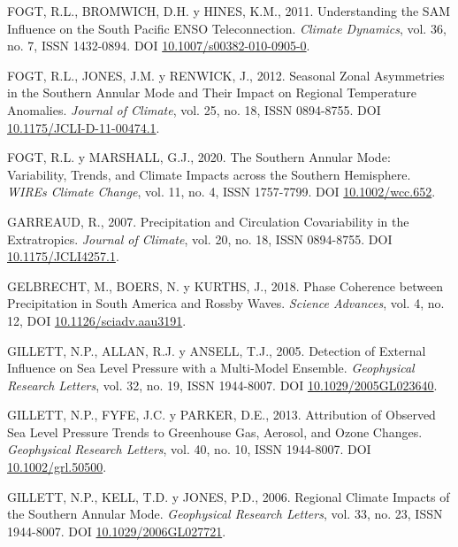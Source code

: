 \documentclass[12pt,oneside,a4paper]{reedthesis}
\newlength{\cslhangindent}
\newenvironment{CSLReferences}[2] %
 {%
  \setlength{\parindent}{0pt}
  \ifodd #1 \everypar{\setlength{\hangindent}{\cslhangindent}}\ignorespaces\fi
  \ifnum #2 > 0
  \setlength{\parskip}{#2\baselineskip}
  \fi
 }%
 {}
\begin{document}
\begin{CSLReferences}{1}{0}
\leavevmode{}%
FOGT, R.L., BROMWICH, D.H. y HINES, K.M., 2011. Understanding the {SAM} Influence on the {South Pacific ENSO} Teleconnection. \emph{Climate Dynamics}, vol. 36, no. 7, ISSN 1432-0894. DOI \href{https://doi.org/10.1007/s00382-010-0905-0}{10.1007/s00382-010-0905-0}.

\leavevmode{}%
FOGT, R.L., JONES, J.M. y RENWICK, J., 2012. Seasonal {Zonal Asymmetries} in the {Southern Annular Mode} and {Their Impact} on {Regional Temperature Anomalies}. \emph{Journal of Climate}, vol. 25, no. 18, ISSN 0894-8755. DOI \href{https://doi.org/10.1175/JCLI-D-11-00474.1}{10.1175/JCLI-D-11-00474.1}.

\leavevmode{}%
FOGT, R.L. y MARSHALL, G.J., 2020. The {Southern Annular Mode}: {Variability}, Trends, and Climate Impacts across the {Southern Hemisphere}. \emph{WIREs Climate Change}, vol. 11, no. 4, ISSN 1757-7799. DOI \href{https://doi.org/10.1002/wcc.652}{10.1002/wcc.652}.

\leavevmode{}%
GARREAUD, R., 2007. Precipitation and {Circulation Covariability} in the {Extratropics}. \emph{Journal of Climate}, vol. 20, no. 18, ISSN 0894-8755. DOI \href{https://doi.org/10.1175/JCLI4257.1}{10.1175/JCLI4257.1}.

\leavevmode{}%
GELBRECHT, M., BOERS, N. y KURTHS, J., 2018. Phase Coherence between Precipitation in {South America} and {Rossby} Waves. \emph{Science Advances}, vol. 4, no. 12, DOI \href{https://doi.org/10.1126/sciadv.aau3191}{10.1126/sciadv.aau3191}.

\leavevmode{}%
GILLETT, N.P., ALLAN, R.J. y ANSELL, T.J., 2005. Detection of External Influence on Sea Level Pressure with a Multi-Model Ensemble. \emph{Geophysical Research Letters}, vol. 32, no. 19, ISSN 1944-8007. DOI \href{https://doi.org/10.1029/2005GL023640}{10.1029/2005GL023640}.

\leavevmode{}%
GILLETT, N.P., FYFE, J.C. y PARKER, D.E., 2013. Attribution of Observed Sea Level Pressure Trends to Greenhouse Gas, Aerosol, and Ozone Changes. \emph{Geophysical Research Letters}, vol. 40, no. 10, ISSN 1944-8007. DOI \href{https://doi.org/10.1002/grl.50500}{10.1002/grl.50500}.

\leavevmode{}%
GILLETT, N.P., KELL, T.D. y JONES, P.D., 2006. Regional Climate Impacts of the {Southern Annular Mode}. \emph{Geophysical Research Letters}, vol. 33, no. 23, ISSN 1944-8007. DOI \href{https://doi.org/10.1029/2006GL027721}{10.1029/2006GL027721}.


\end{CSLReferences}
\end{document}
